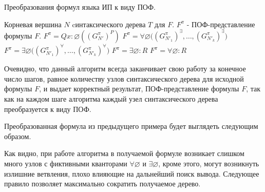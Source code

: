 \documentclass[a4paper,12pt]{article}
\begin{document}
\renewcommand{\algorithmicrequire}{\textbf{Input:}}
\renewcommand{\algorithmicensure}{\textbf{Output:}}
\begin{algorithm}
\caption{ Преобразования формул языка ИП к виду ПОФ.}

\begin{algorithmic}
\REQUIRE Корневая вершина $N$ cинтаксического дерева $T$ для $F$.
\ENSURE $F^{\pi}$ - ПОФ-представление формулы $F$.
  \RETURN  $F^{\pi} = Qx\colon\varnothing ( (G_{N'}^{\pi})^{P} )$   
\ENDIF
{}
  \RETURN  $F^{\pi} = \forall\varnothing \bigl( (G_{N'_1}^{\pi})^{\exists},\ldots,(G_{N'_k}^{\pi})^{\exists}\bigr)$
\ENDIF
{}
  \RETURN  $F^{\pi} = \exists\varnothing \bigl( (G_{N'_1}^{\pi})^{\forall},\ldots,(G_{N'_k}^{\pi})^{\forall}\bigr)$
\ENDIF
{}
  \RETURN  $F^{\pi} = \exists\varnothing\colon R$
\ENDIF
{}
  \RETURN  $F^{\pi} = \forall\varnothing\colon R$
\ENDIF
\end{algorithmic}
\end{algorithm}
Очевидно, что данный алгоритм всегда заканчивает свою работу за конечное число шагов, равное количеству узлов синтаксического дерева для исходной формулы $F$, и выдает корректный результат, ПОФ-представление формулы $F$, так как на каждом шаге алгоритма каждый узел синтаксического дерева преобразуется к виду ПОФ.

Преобразованная формула из предыдущего примера будет выглядеть следующим образом.

\begin{center}
\end{center}

Как видно, при работе алгоритма в получаемой формуле возникает слишком много узлов с фиктивными кванторами $\forall\varnothing$ и $\exists\varnothing$, кроме этого, могут возникнуть излишние ветвления, плохо влияющие на дальнейший поиск вывода. Следующее правило позволяет максимально сократить получаемое дерево.
\end{document}
